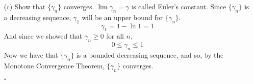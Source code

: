 \documentclass{article}
\begin{document}
(c) Show that $\{\gamma_n\}$ converges. $\lim \gamma_n = \gamma$ is called Euler's constant.
\newline\newline
Since $\{\gamma_n\}$ is a decreasing sequence, $\gamma_1$ will be an upper bound for $\{\gamma_n\}$.
\[\gamma_1 = 1 - \ln{1} = 1\]
And since we showed that $\gamma_n \geq 0$ for all $n$, 
\[0 \leq \gamma_n \leq 1\]
Now we have that $\{\gamma_n\}$ is a bounded decreasing sequence, and so, by the Monotone Convergence Theorem, $\{\gamma_n\}$ converges.
\begin{flushright}
    $\square$
\end{flushright}
\end{document}
